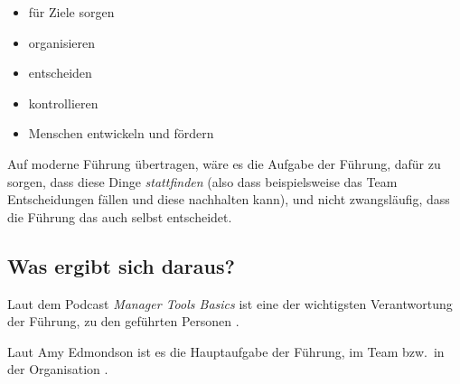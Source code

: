 \begin{itemize}
  \item für Ziele sorgen
  \item organisieren
  \item entscheiden
  \item kontrollieren
  \item Menschen entwickeln und fördern
\end{itemize}

Auf moderne Führung übertragen, wäre es die Aufgabe der Führung, dafür zu sorgen, dass diese Dinge \emph{stattfinden} (also dass beispielsweise das Team Entscheidungen fällen und diese nachhalten kann), und nicht zwangsläufig, dass die Führung das auch selbst entscheidet.


\subsection{Was ergibt sich daraus?}

Laut dem Podcast \emph{Manager Tools Basics} \cite{manager-tools-basics} ist eine der wichtigsten Verantwortung der Führung,  zu den geführten Personen .

Laut Amy Edmondson \cite{the-fearless-organisation}\cite{die-angstfreie-organisation} ist es die Hauptaufgabe der Führung, im Team bzw.~in der Organisation .
